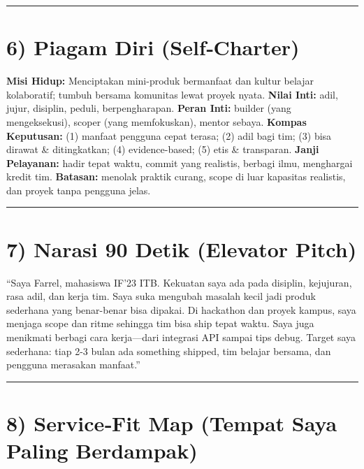\documentclass[
  letterpaper,
  DIV=11,
  numbers=noendperiod]{scrreprt}
\begin{document}
\begin{center}\rule{0.5\linewidth}{0.5pt}\end{center}

\section{6) Piagam Diri (Self‑Charter)}\label{piagam-diri-selfcharter}

\textbf{Misi Hidup:} Menciptakan mini-produk bermanfaat dan kultur
belajar kolaboratif; tumbuh bersama komunitas lewat proyek nyata.
\textbf{Nilai Inti:} adil, jujur, disiplin, peduli, berpengharapan.
\textbf{Peran Inti:} builder (yang mengeksekusi), scoper (yang
memfokuskan), mentor sebaya. \textbf{Kompas Keputusan:} (1) manfaat
pengguna cepat terasa; (2) adil bagi tim; (3) bisa dirawat \&
ditingkatkan; (4) evidence-based; (5) etis \& transparan. \textbf{Janji
Pelayanan:} hadir tepat waktu, commit yang realistis, berbagi ilmu,
menghargai kredit tim. \textbf{Batasan:} menolak praktik curang, scope
di luar kapasitas realistis, dan proyek tanpa pengguna jelas.

\begin{center}\rule{0.5\linewidth}{0.5pt}\end{center}

\section{7) Narasi 90 Detik (Elevator
Pitch)}\label{narasi-90-detik-elevator-pitch}

``Saya Farrel, mahasiswa IF'23 ITB. Kekuatan saya ada pada disiplin,
kejujuran, rasa adil, dan kerja tim. Saya suka mengubah masalah kecil
jadi produk sederhana yang benar-benar bisa dipakai. Di hackathon dan
proyek kampus, saya menjaga scope dan ritme sehingga tim bisa ship tepat
waktu. Saya juga menikmati berbagi cara kerja---dari integrasi API
sampai tips debug. Target saya sederhana: tiap 2-3 bulan ada something
shipped, tim belajar bersama, dan pengguna merasakan manfaat.''

\begin{center}\rule{0.5\linewidth}{0.5pt}\end{center}

\section{8) Service‑Fit Map (Tempat Saya Paling
Berdampak)}\label{servicefit-map-tempat-saya-paling-berdampak}
\end{document}
